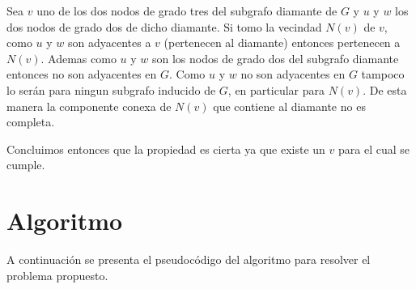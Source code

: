 \documentclass[a4paper,11pt] {article}
\begin{document}
\begin{itemize}
Sea $v$ uno de los dos nodos de grado tres del subgrafo diamante de $G$ y $u$ y $w$ los dos nodos de grado dos de dicho diamante. Si tomo la vecindad $N(v)$ de $v$, como $u$ y $w$ son adyacentes a $v$ (pertenecen al diamante) entonces pertenecen a $N(v)$. Ademas como $u$ y $w$ son los nodos de grado dos del subgrafo diamante entonces no son adyacentes en $G$. Como $u$ y $w$ no son adyacentes en $G$ tampoco lo ser\'an para ningun subgrafo inducido de $G$, en particular para $N(v)$. De esta manera la componente conexa de $N(v)$ que contiene al diamante no es completa.

Concluimos entonces que la propiedad es cierta ya que existe un $v$ para el cual se cumple.

\end{itemize}


\section*{Algoritmo}

A continuaci\'on se presenta el pseudoc\'odigo del algoritmo para resolver el problema propuesto.
\end{document}
